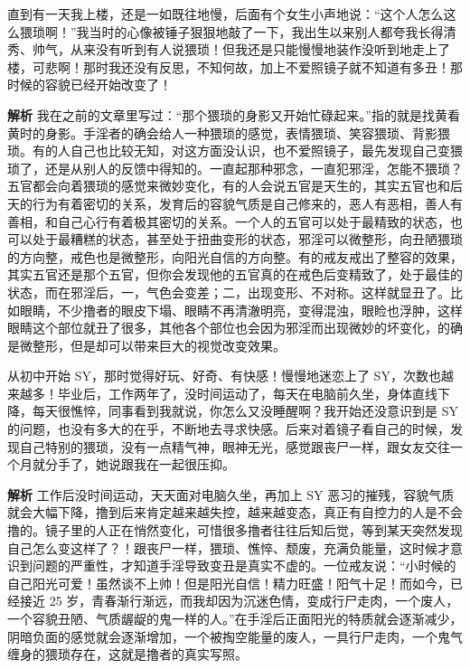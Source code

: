 \begin{case}
    直到有一天我上楼，还是一如既往地慢，后面有个女生小声地说：“这个人怎么这么猥琐啊！”我当时的心像被锤子狠狠地敲了一下，我出生以来别人都夸我长得清秀、帅气，从来没有听到有人说猥琐！但我还是只能慢慢地装作没听到地走上了楼，可悲啊！那时我还没有反思，不知何故，加上不爱照镜子就不知道有多丑！那时候的容貌已经开始改变了！

    \textbf{解析} 我在之前的文章里写过：“那个猥琐的身影又开始忙碌起来。”指的就是找黄看黄时的身影。手淫者的确会给人一种猥琐的感觉，表情猥琐、笑容猥琐、背影猥琐。有的人自己也比较无知，对这方面没认识，也不爱照镜子，最先发现自己变猥琐了，还是从别人的反馈中得知的。一直起那种邪念，一直犯邪淫，怎能不猥琐？五官都会向着猥琐的感觉来微妙变化，有的人会说五官是天生的，其实五官也和后天的行为有着密切的关系，发育后的容貌气质是自己修来的，恶人有恶相，善人有善相，和自己心行有着极其密切的关系。一个人的五官可以处于最精致的状态，也可以处于最糟糕的状态，甚至处于扭曲变形的状态，邪淫可以微整形，向丑陋猥琐的方向整，戒色也是微整形，向阳光自信的方向整。有的戒友戒出了整容的效果，其实五官还是那个五官，但你会发现他的五官真的在戒色后变精致了，处于最佳的状态，而在邪淫后，一，气色会变差；二，出现变形、不对称。这样就显丑了。比如眼睛，不少撸者的眼皮下塌、眼睛不再清澈明亮，变得混浊，眼睑也浮肿，这样眼睛这个部位就丑了很多，其他各个部位也会因为邪淫而出现微妙的坏变化，的确是微整形，但是却可以带来巨大的视觉改变效果。
\end{case}

\begin{case}
    从初中开始 SY，那时觉得好玩、好奇、有快感！慢慢地迷恋上了 SY，次数也越来越多！毕业后，工作两年了，没时间运动了，每天在电脑前久坐，身体直线下降，每天很憔悴，同事看到我就说，你怎么又没睡醒啊？我开始还没意识到是 SY 的问题，也没有多大的在乎，不断地去寻求快感。后来对着镜子看自己的时候，发现自己特别的猥琐，没有一点精气神，眼神无光，感觉跟丧尸一样，跟女友交往一个月就分手了，她说跟我在一起很压抑。

    \textbf{解析} 工作后没时间运动，天天面对电脑久坐，再加上 SY 恶习的摧残，容貌气质就会大幅下降，撸到后来肯定越来越失控，越来越变态，真正有自控力的人是不会撸的。镜子里的人正在悄然变化，可惜很多撸者往往后知后觉，等到某天突然发现自己怎么变这样了？！跟丧尸一样，猥琐、憔悴、颓废，充满负能量，这时候才意识到问题的严重性，才知道手淫导致变丑是真实不虚的。一位戒友说：“小时候的自己阳光可爱！虽然谈不上帅！但是阳光自信！精力旺盛！阳气十足！而如今，已经接近 25 岁，青春渐行渐远，而我却因为沉迷色情，变成行尸走肉，一个废人，一个容貌丑陋、气质龌龊的鬼一样的人。”在手淫后正面阳光的特质就会逐渐减少，阴暗负面的感觉就会逐渐增加，一个被掏空能量的废人，一具行尸走肉，一个鬼气缠身的猥琐存在，这就是撸者的真实写照。
\end{case}

